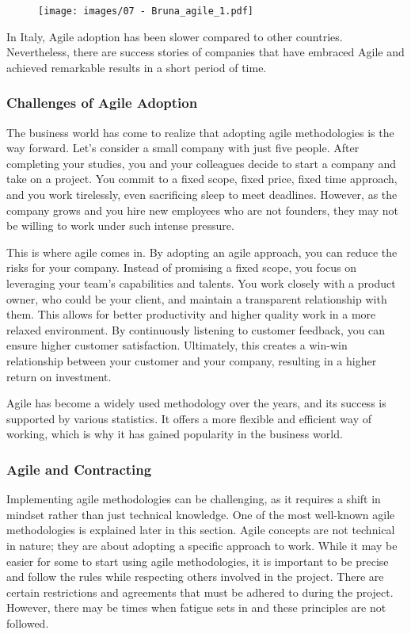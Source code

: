 \begin{figure}[!h]
  \centering
  \texttt{[image: images/07 - Bruna\_agile\_1.pdf]}
\end{figure}

In Italy, Agile adoption has been slower compared to other countries.
Nevertheless, there are success stories of companies that have embraced
Agile and achieved remarkable results in a short period of time.

\subsubsection{Challenges of Agile Adoption}

The business world has come to realize that adopting agile methodologies
is the way forward. Let's consider a small company with just five
people. After completing your studies, you and your colleagues decide to
start a company and take on a project. You commit to a fixed scope,
fixed price, fixed time approach, and you work tirelessly, even
sacrificing sleep to meet deadlines. However, as the company grows and
you hire new employees who are not founders, they may not be willing to
work under such intense pressure.

This is where agile comes in. By adopting an agile approach, you can
reduce the risks for your company. Instead of promising a fixed scope,
you focus on leveraging your team's capabilities and talents. You work
closely with a product owner, who could be your client, and maintain a
transparent relationship with them. This allows for better productivity
and higher quality work in a more relaxed environment. By continuously
listening to customer feedback, you can ensure higher customer
satisfaction. Ultimately, this creates a win-win relationship between
your customer and your company, resulting in a higher return on
investment.

Agile has become a widely used methodology over the years, and its
success is supported by various statistics. It offers a more flexible
and efficient way of working, which is why it has gained popularity in
the business world.

\subsubsection{Agile and Contracting}

Implementing agile methodologies can be challenging, as it requires a
shift in mindset rather than just technical knowledge. One of the most
well-known agile methodologies is explained later in this section. Agile
concepts are not technical in nature; they are about adopting a specific
approach to work. While it may be easier for some to start using agile
methodologies, it is important to be precise and follow the rules while
respecting others involved in the project. There are certain
restrictions and agreements that must be adhered to during the project.
However, there may be times when fatigue sets in and these principles
are not followed.


